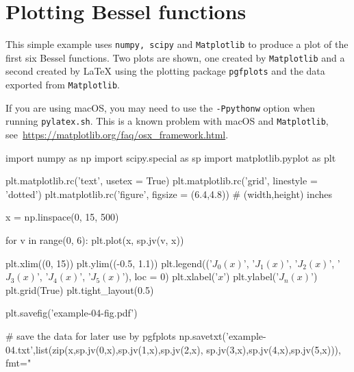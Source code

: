 \documentclass[12pt]{pylatex}
\begin{document}
\section*{Plotting Bessel functions}

\vspace{-5pt}

This simple example uses {\tt\small numpy, scipy} and {\tt\small Matplotlib} to produce a plot
of the first six Bessel functions. Two plots are shown, one created by {\tt\small Matplotlib}
and a second created by LaTeX using the plotting package {\tt\small pgfplots} and the data
exported from {\tt\small Matplotlib}.

If you are using macOS, you may need to use the {\tt\small -Ppythonw} option when running
{\tt\small pylatex.sh}. This is a known problem with macOS and {\tt\small Matplotlib}, see\
\url{https://matplotlib.org/faq/osx_framework.html}.

\vspace{-10pt}

\begin{minipage}[t]{0.60\textwidth}
\begin{python}
   import numpy as np
   import scipy.special as sp
   import matplotlib.pyplot as plt

   plt.matplotlib.rc('text', usetex = True)
   plt.matplotlib.rc('grid', linestyle = 'dotted')
   plt.matplotlib.rc('figure', figsize = (6.4,4.8)) # (width,height) inches

   x = np.linspace(0, 15, 500)

   for v in range(0, 6):
       plt.plot(x, sp.jv(v, x))

   plt.xlim((0, 15))
   plt.ylim((-0.5, 1.1))
   plt.legend(('${J}_0(x)$', '${J}_1(x)$', '${J}_2(x)$',
               '${J}_3(x)$', '${J}_4(x)$', '${J}_5(x)$'), loc = 0)
   plt.xlabel('$x$')
   plt.ylabel('${J}_n(x)$')
   plt.grid(True)
   plt.tight_layout(0.5)

   plt.savefig('example-04-fig.pdf')

   # save the data for later use by pgfplots
   np.savetxt('example-04.txt',list(zip(x,sp.jv(0,x),sp.jv(1,x),sp.jv(2,x),
                                          sp.jv(3,x),sp.jv(4,x),sp.jv(5,x))),
                               fmt="%
\end{python}
\end{minipage}

\clearpage
\end{document}
